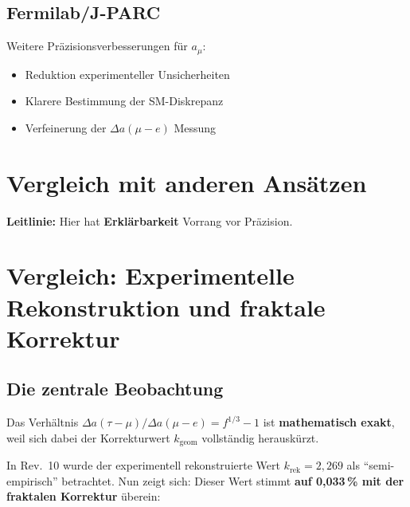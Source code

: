 	\subsection{Fermilab/J-PARC}
	
	Weitere Präzisionsverbesserungen für $a_\mu$:
	\begin{itemize}
		\item Reduktion experimenteller Unsicherheiten
		\item Klarere Bestimmung der SM-Diskrepanz
		\item Verfeinerung der $\Delta a(\mu - e)$ Messung
	\end{itemize}
	
	\section{Vergleich mit anderen Ansätzen}
	
	\begin{table}[h]
		\centering
		\caption{Vergleich verschiedener Ansätze}
	\end{table}
	
	\textbf{Leitlinie:} Hier hat \textbf{Erklärbarkeit} Vorrang vor Präzision.
	\section{Vergleich: Experimentelle Rekonstruktion und fraktale Korrektur}
	
	\subsection{Die zentrale Beobachtung}
	
	Das Verhältnis $\Delta a(\tau-\mu) / \Delta a(\mu-e) = f^{1/3} - 1$ ist \textbf{mathematisch exakt}, weil sich dabei der Korrekturwert $k_{\text{geom}}$ vollständig herauskürzt.
	
	In Rev.~10 wurde der experimentell rekonstruierte Wert $k_\text{rek} = 2{,}269$ als \enquote{semi-empirisch} betrachtet. Nun zeigt sich: Dieser Wert stimmt \textbf{auf 0{,}033\,\% mit der fraktalen Korrektur} überein:
	
